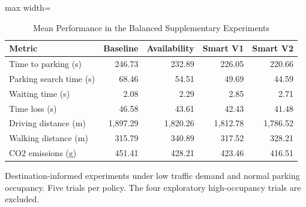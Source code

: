 \begin{table}[t]
\centering
\caption{Mean Performance in the Balanced Supplementary Experiments}
\label{tab:supplementary_performance}
\small
\setlength{\tabcolsep}{4pt}
\begin{adjustbox}{max width=\textwidth}

\begin{tabular}{lrrrr}
\toprule
Metric & Baseline & Availability & Smart V1 & Smart V2\\
\midrule
Time to parking (s) & 246.73 & 232.89 & 226.05 & 220.66\\
Parking search time (s) & 68.46 & 54.51 & 49.69 & 44.59\\
Waiting time (s) & 2.08 & 2.29 & 2.85 & 2.71\\
Time loss (s) & 46.58 & 43.61 & 42.43 & 41.48\\
Driving distance (m) & 1,897.29 & 1,820.26 & 1,812.78 & 1,786.52\\
\addlinespace
Walking distance (m) & 315.79 & 340.89 & 317.52 & 328.21\\
CO2 emissions (g) & 451.41 & 428.21 & 423.46 & 416.51\\
\bottomrule
\end{tabular}
\end{adjustbox}
\par\smallskip
\begin{minipage}{\textwidth}
\footnotesize
Destination-informed experiments under low traffic demand and normal parking occupancy. Five trials per policy. The four exploratory high-occupancy trials are excluded.
\end{minipage}
\end{table}
